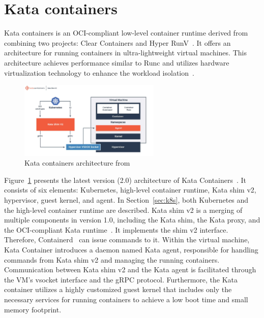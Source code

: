 \section{Kata containers}
\label{sec:Kata}

Kata containers is an OCI-compliant low-level container runtime derived from combining two projects: Clear Containers and Hyper RunV~\cite*{Kata-Containers}. It offers an architecture for running containers in ultra-lightweight virtual machines. This architecture achieves performance similar to Runc and 
utilizes hardware virtualization technology to enhance the workload isolation~\cite*{9198653}.
\begin{figure}[htp]
  \centering
  \includegraphics[width=0.6\textwidth]{images/kata.PNG}
  \caption[Kata containers architecture]{Kata containers architecture from~\cite*{Kata-Containers} }
  \label{fig:kata}
\end{figure}
Figure~\ref{fig:kata} presents the latest version (2.0) architecture of Kata Containers~\cite*{Kata_arch}. It consists of six elements: Kubernetes, high-level container runtime, Kata shim v2, hypervisor, guest kernel, and agent. In Section~\ref{sec:k8s}, both Kubernetes and the high-level container 
runtime are described. Kata shim v2 is a merging of multiple components in version 1.0, including the Kata shim, the Kata proxy, and the OCI-compliant Kata runtime~\cite*{Kata_arch}. It implements the shim v2 interface. Therefore, Containerd~\cite*{containerd} can issue commands to it. Within the 
virtual machine, Kata Container introduces a daemon named Kata agent, responsible for handling commands from Kata shim v2 and managing the running containers. Communication between Kata shim v2 and the Kata agent is facilitated through the VM's vsocket interface and the gRPC protocol. Furthermore, the 
Kata container utilizes a highly customized guest kernel that includes only the necessary services for running containers to achieve a low boot time and small memory footprint.


